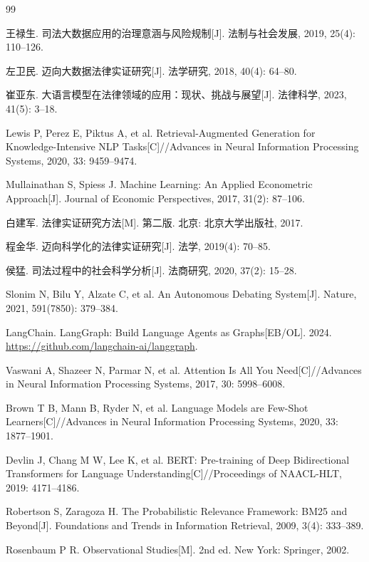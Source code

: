 \documentclass[12pt,a4paper,twoside]{ctexart}
\begin{document}
\begin{thebibliography}{99}

王禄生. 司法大数据应用的治理意涵与风险规制[J]. 法制与社会发展, 2019, 25(4): 110--126.

左卫民. 迈向大数据法律实证研究[J]. 法学研究, 2018, 40(4): 64--80.

崔亚东. 大语言模型在法律领域的应用：现状、挑战与展望[J]. 法律科学, 2023, 41(5): 3--18.

Lewis P, Perez E, Piktus A, et al. Retrieval-Augmented Generation for Knowledge-Intensive NLP Tasks[C]//Advances in Neural Information Processing Systems, 2020, 33: 9459--9474.

Mullainathan S, Spiess J. Machine Learning: An Applied Econometric Approach[J]. Journal of Economic Perspectives, 2017, 31(2): 87--106.

白建军. 法律实证研究方法[M]. 第二版. 北京: 北京大学出版社, 2017.

程金华. 迈向科学化的法律实证研究[J]. 法学, 2019(4): 70--85.

侯猛. 司法过程中的社会科学分析[J]. 法商研究, 2020, 37(2): 15--28.

Slonim N, Bilu Y, Alzate C, et al. An Autonomous Debating System[J]. Nature, 2021, 591(7850): 379--384.

LangChain. LangGraph: Build Language Agents as Graphs[EB/OL]. 2024. \url{https://github.com/langchain-ai/langgraph}.

Vaswani A, Shazeer N, Parmar N, et al. Attention Is All You Need[C]//Advances in Neural Information Processing Systems, 2017, 30: 5998--6008.

Brown T B, Mann B, Ryder N, et al. Language Models are Few-Shot Learners[C]//Advances in Neural Information Processing Systems, 2020, 33: 1877--1901.

Devlin J, Chang M W, Lee K, et al. BERT: Pre-training of Deep Bidirectional Transformers for Language Understanding[C]//Proceedings of NAACL-HLT, 2019: 4171--4186.

Robertson S, Zaragoza H. The Probabilistic Relevance Framework: BM25 and Beyond[J]. Foundations and Trends in Information Retrieval, 2009, 3(4): 333--389.

Rosenbaum P R. Observational Studies[M]. 2nd ed. New York: Springer, 2002.


\end{thebibliography}
\end{document}
